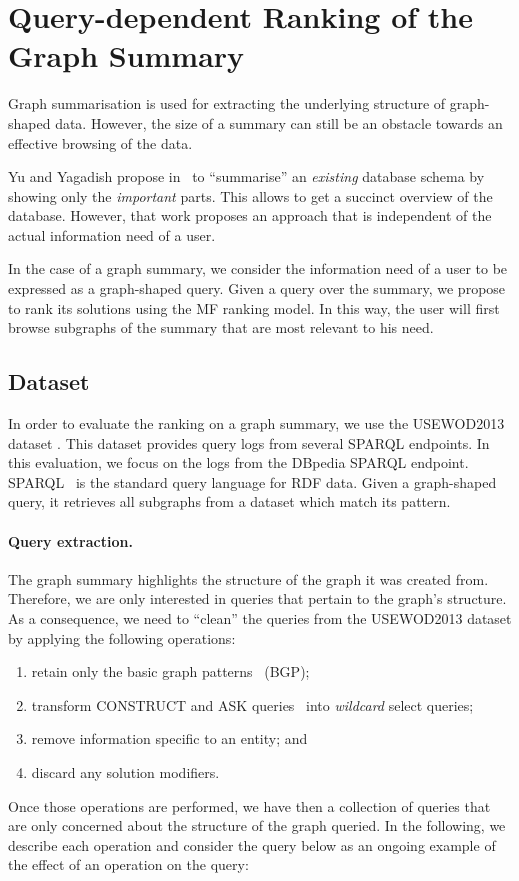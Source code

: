 \section{Query-dependent Ranking of the Graph Summary}
\label{sec:summary-ranking}

Graph summarisation is used for extracting the underlying structure of graph-shaped data. However, the size of a summary can still be an obstacle towards an effective browsing of the data.

Yu and Yagadish propose in~\cite{yu:2006:schema-summarization} to ``summarise'' an \emph{existing} database schema by showing only the \emph{important} parts. This allows to get a succinct overview of the database.
However, that work proposes an approach that is independent of the actual information need of a user.

In the case of a graph summary, we consider the information need of a user to be expressed as a graph-shaped query. Given a query over the summary, we propose to rank its solutions using the MF ranking model. In this way, the user will first browse subgraphs of the summary that are most relevant to his need.

\subsection{Dataset}
\label{sec:summary-ranking:dataset}

In order to evaluate the ranking on a graph summary, we use the USEWOD2013 dataset \cite{usewod:2013}. This dataset provides query logs from several SPARQL endpoints. In this evaluation, we focus on the logs from the DBpedia SPARQL endpoint. SPARQL~\cite{PrudS08} is the standard query language for RDF data. Given a graph-shaped query, it retrieves all subgraphs from a dataset which match its pattern.

\paragraph{Query extraction.}

The graph summary highlights the structure of the graph it was created from. Therefore, we are only interested in queries that pertain to the graph's structure. As a consequence, we need to ``clean'' the queries from the USEWOD2013 dataset by applying the following operations:
\begin{enumerate}
	\item retain only the basic graph patterns~\cite{PrudS08} (BGP);
	\item transform CONSTRUCT and ASK queries~\cite{PrudS08} into \emph{wildcard} select queries;
	\item remove information specific to an entity; and
	\item discard any solution modifiers.
\end{enumerate}
Once those operations are performed, we have then a collection of queries that are only concerned about the structure of the graph queried.
In the following, we describe each operation and consider the query below as an ongoing example of the effect of an operation on the query:

